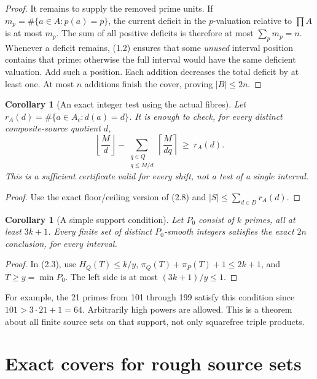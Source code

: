 \documentclass[11pt,a4paper]{article}
\newtheorem{corollary}[theorem]{Corollary}
\theoremstyle{remark}
\begin{document}
\begin{proof}
It remains to supply the removed prime units. If
\(m_p=\#\{a\in A:p(a)=p\}\), the current deficit in the \(p\)-valuation
relative to \(\prod A\) is at most \(m_p\). The sum of all positive
deficits is therefore at most \(\sum_p m_p=n\).
Whenever a deficit remains, (1.2) ensures that some \emph{unused}
interval position contains that prime: otherwise the full interval
would have the same deficient valuation. Add such a position.
Each addition decreases the total deficit by at least one.
At most \(n\) additions finish the cover, proving \(|B|\le2n\).
\end{proof}

\begin{corollary}[An exact integer test using the actual fibres]
\label{cor:finite}
Let \(r_A(d)=\#\{a\in A_c:d(a)=d\}\). It is enough to check, for every
distinct composite-source quotient \(d\),
\[
 \left\lfloor\frac M d\right\rfloor
 -
 \sum_{\substack{q\in Q\\q\le M/d}}
 \left\lceil\frac M{dq}\right\rceil
 \ \ge\ r_A(d).
 \tag{2.11}
\]
This is a sufficient certificate valid for \emph{every} shift, not a
test of a single interval.
\end{corollary}
\begin{proof}
Use the exact floor/ceiling version of (2.8) and
\(|S|\le\sum_{d\in D}r_A(d)\).
\end{proof}

\begin{corollary}[A simple support condition]
\label{cor:cardinality}
Let \(P_0\) consist of \(k\) primes, all at least \(3k+1\).
Every finite set of distinct \(P_0\)-smooth integers satisfies the
exact \(2n\) conclusion, for every interval.
\end{corollary}
\begin{proof}
In (2.3), use \(H_Q(T)\le k/y\),
\(\pi_Q(T)+\pi_P(T)+1\le2k+1\), and \(T\ge y=\min P_0\).
The left side is at most \((3k+1)/y\le1\).
\end{proof}

For example, the 21 primes from 101 through 199 satisfy this condition
since \(101>3\cdot21+1=64\). Arbitrarily high powers are allowed.
This is a theorem about all finite source sets on that support, not
only squarefree triple products.

\section{Exact covers for rough source sets}
\label{sec:rough}
\end{document}

